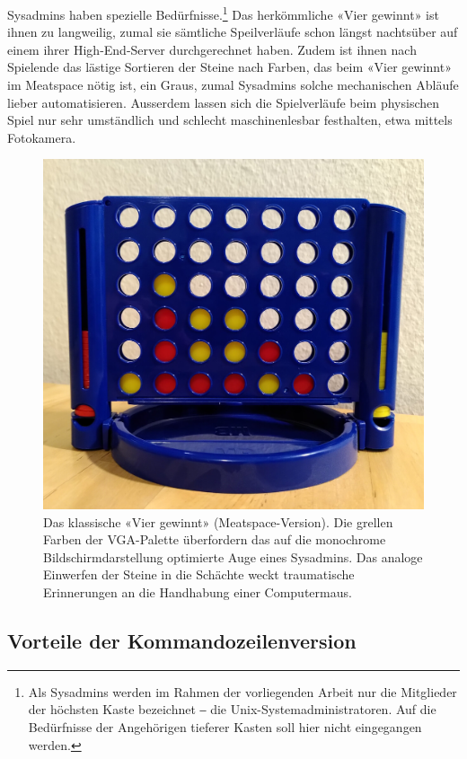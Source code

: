 \documentclass[a4paper,11pt,hidelinks]{scrartcl}
\begin{document}
Sysadmins haben spezielle Bedürfnisse.\footnote{Als Sysadmins werden im Rahmen der vorliegenden Arbeit nur die Mitglieder der höchsten Kaste bezeichnet ‒ die Unix-Systemadministratoren. Auf die Bedürfnisse der Angehörigen tieferer Kasten soll hier nicht eingegangen werden.} Das herkömmliche «Vier gewinnt» ist ihnen zu langweilig, zumal sie sämtliche Speilverläufe schon längst nachtsüber auf einem ihrer High-End-Server durchgerechnet haben. Zudem ist ihnen nach Spielende das lästige Sortieren der Steine nach Farben, das beim «Vier gewinnt» im Meatspace nötig ist, ein Graus, zumal Sysadmins solche mechanischen Abläufe lieber automatisieren. Ausserdem lassen sich die Spielverläufe beim physischen Spiel nur sehr umständlich und schlecht maschinenlesbar festhalten, etwa mittels Fotokamera.

\begin{figure}
    \centering
    \includegraphics[width=1.0\linewidth]{pics/vier-gewinnt.jpg}
    \caption{Das klassische «Vier gewinnt» (Meatspace-Version). Die grellen Farben der VGA-Palette überfordern das auf die monochrome Bildschirmdarstellung optimierte Auge eines Sysadmins. Das analoge Einwerfen der Steine in die Schächte weckt traumatische Erinnerungen an die Handhabung einer Computermaus.}
    \label{fig:vier-gewinnt}
\end{figure}

\subsection{Vorteile der Kommandozeilenversion}
\end{document}

